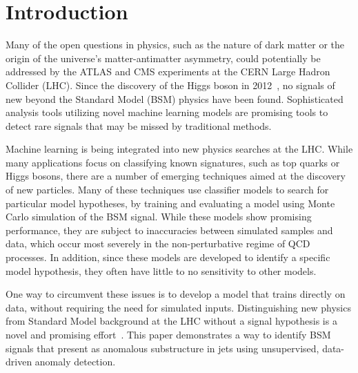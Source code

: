 \documentclass[12pt, a4paper]{article}
\begin{document}

\clearpage







\section{Introduction}

Many of the open questions in physics, such as the nature of dark matter or the origin of the universe's matter-antimatter asymmetry, could potentially be addressed by the ATLAS and CMS experiments at the CERN Large Hadron Collider (LHC). 
Since the discovery of the Higgs boson in 2012~\cite{atlas_higgs,cms_higgs}, no signals of new beyond the Standard Model (BSM) physics have been found. 
Sophisticated analysis tools utilizing novel machine learning models are promising tools to detect rare signals that may be missed by traditional methods. 

Machine learning is being integrated into new physics searches at the LHC. 
While many applications focus on classifying known signatures, such as top quarks or Higgs bosons, there are a number of emerging techniques aimed at the discovery of new particles. 
Many of these techniques use classifier models to search for particular model hypotheses, by training and evaluating a model using Monte Carlo simulation of the BSM signal.
While these models show promising performance, they are subject to inaccuracies between simulated samples and data, which occur most severely in the non-perturbative regime of QCD processes. In addition, since these models are developed to identify a specific model hypothesis, they often have little to no sensitivity to other models.

One way to circumvent these issues is to develop a model that trains directly on data, without requiring the need for simulated inputs.
Distinguishing new physics from Standard Model background at the LHC without a signal hypothesis is a novel and promising effort~\cite{CWoLa}. 
This paper demonstrates a way to identify BSM signals that present as anomalous substructure in jets using unsupervised, data-driven anomaly detection. 
\end{document}

